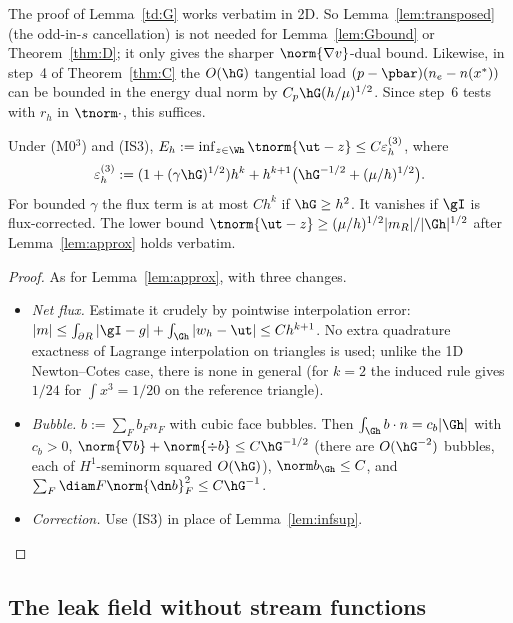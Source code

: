 \begin{remark}\label{td:nocancel2d}
The proof of Lemma~\ref{td:G} works verbatim in 2D. So Lemma~\ref{lem:transposed} (the odd-in-$s$ cancellation) is not needed for Lemma~\ref{lem:Gbound} or Theorem~\ref{thm:D}; it only gives the sharper $\norm{\nabla v}$-dual bound. Likewise, in step~4 of Theorem~\ref{thm:C} the $O(\hG)$ tangential load $(p-\pbar)(n_e-n(x^\ast))$ can be bounded in the energy dual norm by $C_p\hG(h/\mu)^{1/2}$. Since step~6 tests with $r_h$ in $\tnorm\cdot$, this suffices.
\end{remark}

\begin{lemma}[Approximation in $\Wh$]\label{td:approx}
Under (M0$^3$) and (IS3), $E_h:=\inf_{z\in\Wh}\tnorm{\ut-z}\le C\epsd$, where
\[
\epsd:=(1+(\gamma\hG)^{1/2})h^k+h^{k+1}\bigl(\hG^{-1/2}+(\mu/h)^{1/2}\bigr).
\]
For bounded $\gamma$ the flux term is at most $Ch^k$ if $\hG\ge h^2$. It vanishes if $\gI$ is flux-corrected. The lower bound $\tnorm{\ut-z}\ge(\mu/h)^{1/2}|m_R|/|\Gh|^{1/2}$ after Lemma~\ref{lem:approx} holds verbatim.
\end{lemma}

\begin{proof}
As for Lemma~\ref{lem:approx}, with three changes.
\begin{itemize}
\item \emph{Net flux.} Estimate it crudely by pointwise interpolation error: $|m|\le\int_{\partial R}|\gI-g|+\int_{\Gh}|w_h-\ut|\le Ch^{k+1}$. No extra quadrature exactness of Lagrange interpolation on triangles is used; unlike the 1D Newton--Cotes case, there is none in general (for $k=2$ the induced rule gives $1/24$ for $\int x^3=1/20$ on the reference triangle).
\item \emph{Bubble.} $b:=\sum_Fb_Fn_F$ with cubic face bubbles. Then $\int_{\Gh}b\cdot n=c_b|\Gh|$ with $c_b>0$, $\norm{\nabla b}+\norm{\div b}\le C\hG^{-1/2}$ (there are $O(\hG^{-2})$ bubbles, each of $H^1$-seminorm squared $O(\hG)$), $\norm b_{\Gh}\le C$, and $\sum_F\diam F\norm{\dn b}^2_F\le C\hG^{-1}$.
\item \emph{Correction.} Use (IS3) in place of Lemma~\ref{lem:infsup}.\qedhere
\end{itemize}
\end{proof}

\subsection{The leak field without stream functions}

